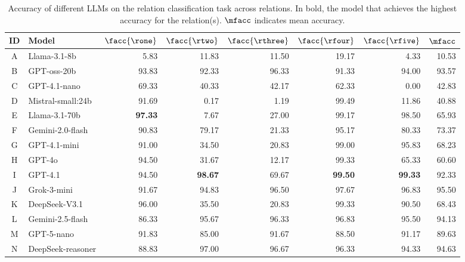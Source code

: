 \begin{table}[!h]
\centering
\caption{Accuracy of different LLMs on the relation classification task across relations. In bold, the model that achieves the highest accuracy for the relation(s). $\mfacc$ indicates mean accuracy.}
\footnotesize
\begin{tabular}{cl !{\color{white!80!black} \vline width 1pt} rrrrr !{\color{white!80!black} \vline width 1pt} r}
\toprule
\textbf{ID} & \textbf{Model} &
$\facc{\rone}$ & $\facc{\rtwo}$ & $\facc{\rthree}$ & $\facc{\rfour}$ & $\facc{\rfive}$ & $\mfacc$ \\
\midrule
A & \textsf{Llama-3.1-8b} & 5.83 & \textcolor{blue!60!black}{11.83} & 11.50 & 19.17 & \textcolor{blue!60!black}{4.33} & \textcolor{blue!60!black}{10.53} \\
B & \textsf{GPT-oss-20b} & 93.83 & 92.33 & 96.33 & 91.33 & 94.00 & \textcolor{blue!60!black}{93.57} \\
C & \textsf{GPT-4.1-nano} & \textcolor{blue!60!black}{69.33} & \textcolor{blue!60!black}{40.33} & \textcolor{blue!60!black}{42.17} & 62.33 & 0.00 & \textcolor{blue!60!black}{42.83} \\
D & \textsf{Mistral-small:24b} & 91.69 & 0.17 & 1.19 & 99.49 & 11.86 & 40.88 \\
E & \textsf{Llama-3.1-70b} & \textbf{97.33} & 7.67 & 27.00 & 99.17 & 98.50 & 65.93 \\
F & \textsf{Gemini-2.0-flash} & 90.83 & 79.17 & 21.33 & 95.17 & 80.33 & 73.37 \\
G & \textsf{GPT-4.1-mini} & 91.00 & 34.50 & 20.83 & 99.00 & 95.83 & 68.23 \\
H & \textsf{GPT-4o} & 94.50 & 31.67 & 12.17 & 99.33 & 65.33 & 60.60 \\
I & \textsf{GPT-4.1} & 94.50 & \textbf{98.67} & 69.67 & \textbf{99.50} & \textbf{99.33} & 92.33 \\
J & \textsf{Grok-3-mini} & 91.67 & 94.83 & 96.50 & 97.67 & 96.83 & 95.50 \\
K & \textsf{DeepSeek-V3.1} & 96.00 & 35.50 & 20.83 & 99.33 & 90.50 & 68.43 \\
L & \textsf{Gemini-2.5-flash} & 86.33 & 95.67 & 96.33 & 96.83 & 95.50 & 94.13 \\
M & \textsf{GPT-5-nano} & 91.83 & 85.00 & \textcolor{blue!60!black}{91.67} & 88.50 & 91.17 & \textcolor{blue!60!black}{89.63} \\
N & \textsf{DeepSeek-reasoner} & 88.83 & 97.00 & 96.67 & 96.33 & 94.33 & 94.63 \\

\end{tabular}
\end{table}
